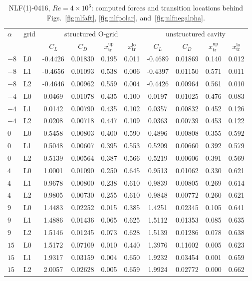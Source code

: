 \begin{table}[tp]
  \centering\small
  \caption{NLF(1)-0416, $Re\!=\!4\!\times\!10^6$: computed forces and transition locations behind Figs.~\ref{fig:nlfaft}, \ref{fig:nlfpolar}, and~\ref{fig:nlfnegalpha}.}
  \label{tab:data_nlf}
  \begin{tabular}{ll cccc cccc}
    \toprule
    $\alpha$ & grid & \multicolumn{4}{c}{structured O-grid} & \multicolumn{4}{c}{unstructured cavity} \\ & & $C_L$ & $C_D$ & $x_\mathrm{tr}^\mathrm{up}$ & $x_\mathrm{tr}^\mathrm{lo}$ & $C_L$ & $C_D$ & $x_\mathrm{tr}^\mathrm{up}$ & $x_\mathrm{tr}^\mathrm{lo}$ \\
    \midrule
    $-8$ & L0 & -0.4426 & 0.01830 & 0.195 & 0.011 & -0.4689 & 0.01869 & 0.140 & 0.012 \\
    $-8$ & L1 & -0.4656 & 0.01093 & 0.538 & 0.006 & -0.4397 & 0.01150 & 0.571 & 0.011 \\
    $-8$ & L2 & -0.4646 & 0.00962 & 0.559 & 0.004 & -0.4426 & 0.00964 & 0.561 & 0.010 \\
    $-4$ & L0 & 0.0469 & 0.01078 & 0.435 & 0.100 & 0.0197 & 0.01025 & 0.476 & 0.083 \\
    $-4$ & L1 & 0.0142 & 0.00790 & 0.435 & 0.102 & 0.0357 & 0.00832 & 0.452 & 0.126 \\
    $-4$ & L2 & 0.0208 & 0.00718 & 0.447 & 0.109 & 0.0363 & 0.00739 & 0.453 & 0.122 \\
    $0$ & L0 & 0.5458 & 0.00803 & 0.400 & 0.590 & 0.4896 & 0.00808 & 0.355 & 0.592 \\
    $0$ & L1 & 0.5048 & 0.00607 & 0.395 & 0.553 & 0.5209 & 0.00660 & 0.392 & 0.579 \\
    $0$ & L2 & 0.5139 & 0.00564 & 0.387 & 0.566 & 0.5219 & 0.00606 & 0.391 & 0.569 \\
    $4$ & L0 & 1.0001 & 0.01090 & 0.250 & 0.645 & 0.9513 & 0.01062 & 0.330 & 0.621 \\
    $4$ & L1 & 0.9678 & 0.00800 & 0.238 & 0.610 & 0.9839 & 0.00805 & 0.269 & 0.614 \\
    $4$ & L2 & 0.9805 & 0.00730 & 0.255 & 0.610 & 0.9848 & 0.00772 & 0.260 & 0.621 \\
    $9$ & L0 & 1.4483 & 0.02252 & 0.015 & 0.385 & 1.4251 & 0.02345 & 0.105 & 0.641 \\
    $9$ & L1 & 1.4886 & 0.01436 & 0.065 & 0.625 & 1.5112 & 0.01353 & 0.085 & 0.635 \\
    $9$ & L2 & 1.5146 & 0.01245 & 0.073 & 0.628 & 1.5139 & 0.01286 & 0.078 & 0.638 \\
    $15$ & L0 & 1.5172 & 0.07109 & 0.010 & 0.440 & 1.3976 & 0.11602 & 0.005 & 0.623 \\
    $15$ & L1 & 1.9317 & 0.03159 & 0.004 & 0.650 & 1.9232 & 0.03454 & 0.001 & 0.659 \\
    $15$ & L2 & 2.0057 & 0.02628 & 0.005 & 0.659 & 1.9924 & 0.02772 & 0.000 & 0.662 \\
    \bottomrule
  \end{tabular}
\end{table}
